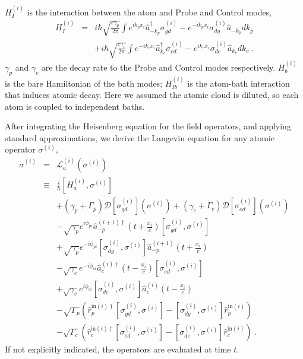 \documentclass[aps, pra, reprint, amsmath, amssymb, groupedaddress, acknowledgments]{revtex4-1}
\begin{document}
$H_{I}^{(i)}$ is the interaction between the atom and Probe and Control modes, 
\begin{eqnarray}
H_{I}^{(i)} &=& i \hbar \sqrt{\frac{c \gamma_p}{2\pi}} \int e^{ik_p x_i}\hat{a}^\dag_{-k_p} \sigma_{gd}^{(i)} - e^{-ik_p x_i}\sigma_{dg}^{(i)}\hat{a}_{-k_p} dk_p \nonumber \\
&&+ i \hbar\sqrt{\frac{c \gamma_c}{2\pi}} \int e^{-ik_c x_i} \hat{a}^\dag_{k_c} \sigma_{ed}^{(i)} - e^{ik_c x_i} \sigma_{de}^{(i)}\hat{a}_{k_c} dk_c~. \nonumber 
\end{eqnarray}
$\gamma_p$ and $\gamma_c$ are the decay rate to the Probe and Control modes respectively.  $H_{b}^{(i)}$ is the bare Hamiltonian of the bath modes; $H_{Ib}^{(i)}$ is the atom-bath interaction that induces atomic decay.  Here we assumed the atomic cloud is diluted, so each atom is coupled to independent baths.

After integrating the Heisenberg equation for the field operators, and applying standard approximations, we derive the Langevin equation for any atomic operator $\sigma^{(i)}$,
\begin{eqnarray} \label{eq:le_sigmai} 
\dot{\sigma}^{(i)} &=& \mathcal{L}_a^{(i)}(\sigma^{(i)}) \nonumber \\
&\equiv& \frac{i}{\hbar} [H_a^{(i)}, \sigma^{(i)}]  \nonumber \\
&&+ (\gamma_p+\Gamma_p) \mathcal{D}[\sigma_{gd}^{(i)}] (\sigma^{(i)}) + (\gamma_c+\Gamma_c) \mathcal{D}[\sigma_{ed}^{(i)}] (\sigma^{(i)})  \nonumber \\
&&- \sqrt{\gamma_p}e^{i\phi_{pi}} \hat{a}^{(i+1)\dag}_{-p}(t+\frac{x_i}{c}) [\sigma_{gd}^{(i)},\sigma^{(i)}] \nonumber \\
&&+ \sqrt{\gamma_p} e^{-i\phi_{pi}}[\sigma_{dg}^{(i)},\sigma^{(i)}] \hat{a}^{(i+1)}_{-p}(t+\frac{x_i}{c}) \nonumber \\
&&- \sqrt{\gamma_c} e^{-i\phi_{ci}}\hat{a}^{(i)\dag}_{c}(t - \frac{x_i}{c}) [\sigma_{ed}^{(i)},\sigma^{(i)}] \nonumber \\
&&+ \sqrt{\gamma_c} e^{i\phi_{ci}} [\sigma_{de}^{(i)},\sigma^{(i)}] \hat{a}^{(i)}_{c}(t - \frac{x_i}{c})  \nonumber \\
 &&- \sqrt{\Gamma_p} (\hat{r}^{\textrm{in}(i)\dag}_{p} [\sigma_{gd}^{(i)},\sigma^{(i)}] - [\sigma_{dg}^{(i)},\sigma^{(i)}]\hat{r}^{\textrm{in}(i)}_{p})  \nonumber \\
&& - \sqrt{\Gamma_c} (\hat{r}^{\textrm{in}(i)\dag}_{c} [\sigma_{ed}^{(i)},\sigma^{(i)}] - [\sigma_{de}^{(i)},\sigma^{(i)}]\hat{r}^{\textrm{in}(i)}_{c})  ~.
\end{eqnarray}
If not explicitly indicated, the operators are evaluated at time $t$.
\end{document}
